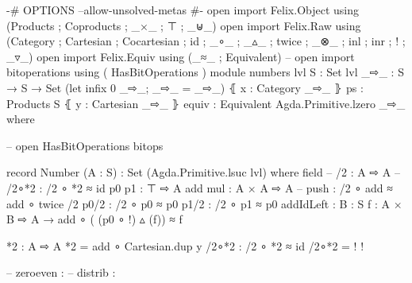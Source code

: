 

\begin{code}

{-# OPTIONS --allow-unsolved-metas #-}
open import Felix.Object using (Products ;  Coproducts ;   _×_ ; ⊤ ; _⊎_)
open import Felix.Raw using (Category ; Cartesian ; Cocartesian ; id ; _∘_ ; _▵_ ; twice ; _⊗_ ; inl ; inr ; ! ; _▿_)
open import Felix.Equiv using (_≈_ ; Equivalent)
-- open import bitoperations using ( HasBitOperations )
module numbers {lvl} {S : Set lvl} {_⇨_ : S  → S  → Set} (let infix 0 _⇨_; _⇨_ = _⇨_) ⦃ x : Category _⇨_ ⦄ {{ps : Products S}} ⦃ y : Cartesian _⇨_ ⦄{{ equiv : Equivalent Agda.Primitive.lzero _⇨_ }} where




-- open HasBitOperations bitops

record Number (A : S) : Set (Agda.Primitive.lsuc lvl) where
  field
    -- %
    /2 : A ⇨ A
    -- /2∘*2 : /2 ∘ *2 ≈ id
    p0 p1 : ⊤ ⇨ A
    add mul : A × A ⇨ A
    -- push : /2 ∘ add ≈ add ∘ twice /2
    p0/2 : /2 ∘ p0 ≈ p0
    p1/2 : /2 ∘ p1 ≈ p0
    addIdLeft : {B : S} {f : A × B ⇨ A} →  add ∘ ( (p0 ∘ !) ▵ (f)) ≈ f


  *2 : A ⇨ A
  *2 = add ∘ Cartesian.dup y
  /2∘*2 : /2 ∘ *2 ≈ id
  /2∘*2 = {! !}

    -- zeroeven : %
    -- distrib : %

\end{code}
